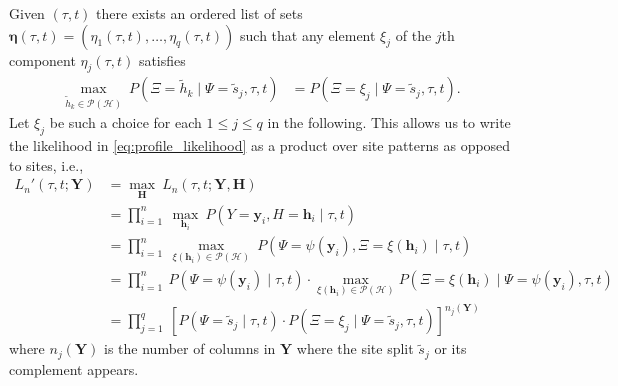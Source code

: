 \documentclass[a4paper]{article}
\newcommand{\fullAlignment}{\mathbf{Y}}
\newcommand{\alignmentColumn}{\mathbf{y}}
\newcommand{\alignmentColumnRV}{Y}
\newcommand{\siteSplit}{\tilde{s}}
\newcommand{\fullAncestralStates}{\mathbf{H}}
\newcommand{\ancestralStateColumn}{\mathbf{h}}
\newcommand{\ancestralStateColumnRV}{H}
\newcommand{\ancestralSplit}{\tilde{h}}
\newcommand{\ancestralSplitSet}{\mathcal{H}}
\newcommand{\ancestralSplitPartition}{\eta}
\newcommand{\fullAncestralSplitPartitions}{\boldsymbol\eta}
\newcommand{\patternToSplit}{\psi}
\newcommand{\ancestralToSplit}{\xi}
\newcommand{\siteSplitRV}{\Psi}
\newcommand{\ancestralSplitRV}{\Xi}
\newcommand{\nCols}{n}
\newcommand{\nSiteSplits}{q}
\begin{document}
Given $(\tau, t)$ there exists an ordered list of sets $\fullAncestralSplitPartitions(\tau, t)=(\ancestralSplitPartition_1(\tau, t),\ldots,\ancestralSplitPartition_\nSiteSplits(\tau, t))$ such that any element $\xi_j$ of the $j$th component $\ancestralSplitPartition_j(\tau, t)$ satisfies
\begin{align*}
\max_{\ancestralSplit_k\in\mathcal{P}(\ancestralSplitSet)} \ P(\ancestralSplitRV=\ancestralSplit_k \mid \siteSplitRV=\siteSplit_j, \tau, t) &= P(\ancestralSplitRV = \xi_j \mid \siteSplitRV=\siteSplit_j, \tau, t).
\end{align*}
Let $\xi_j$ be such a choice for each $1 \leq j \leq q$ in the following.
This allows us to write the likelihood in \eqref{eq:profile_likelihood} as a product over site patterns as opposed to sites, i.e.,
\begin{align}
L_\nCols'(\tau, t; \fullAlignment) &= \max_{\fullAncestralStates} \ L_\nCols(\tau, t; \fullAlignment, \fullAncestralStates) \\
                             &= \prod_{i=1}^{\nCols} \ \max_{\ancestralStateColumn_i} \ P(\alignmentColumnRV=\alignmentColumn_i, \ancestralStateColumnRV=\ancestralStateColumn_i \mid \tau, t) \\
                             &= \prod_{i=1}^{\nCols} \ \max_{\ancestralToSplit(\ancestralStateColumn_i)\in\mathcal{P}(\ancestralSplitSet)} \ P(\siteSplitRV=\patternToSplit(\alignmentColumn_i), \ancestralSplitRV=\ancestralToSplit(\ancestralStateColumn_i) \mid \tau, t) \\
                             &= \prod_{i=1}^{\nCols} \ P(\siteSplitRV=\patternToSplit(\alignmentColumn_i) \mid \tau, t) \cdot \max_{\ancestralToSplit(\ancestralStateColumn_i)\in\mathcal{P}(\ancestralSplitSet)} P(\ancestralSplitRV=\ancestralToSplit(\ancestralStateColumn_i) \mid \siteSplitRV=\patternToSplit(\alignmentColumn_i), \tau, t) \\
                             &= \prod_{j=1}^{\nSiteSplits} \ \left[P(\siteSplitRV=\siteSplit_j \mid \tau, t)\cdot P(\ancestralSplitRV=\xi_j \mid \siteSplitRV=\siteSplit_j, \tau, t)\right] ^{\nCols_j(\fullAlignment)} \label{eq:site_pattern_likelihood}
\end{align}
where $\nCols_j(\fullAlignment)$ is the number of columns in $\fullAlignment$ where the site split $\siteSplit_j$ or its complement appears.
\end{document}
